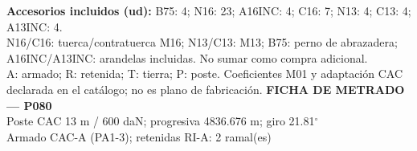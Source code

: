 \begingroup\scriptsize
\textbf{Accesorios incluidos (ud):} B75: 4; N16: 23; A16INC: 4; C16: 7; N13: 4; C13: 4; A13INC: 4.\\
N16/C16: tuerca/contratuerca M16; N13/C13: M13; B75: perno de abrazadera; A16INC/A13INC: arandelas incluidas. No sumar como compra adicional.\\
A: armado; R: retenida; T: tierra; P: poste. Coeficientes M01 y adaptación CAC declarada en el catálogo; no es plano de fabricación.
\endgroup\endgroup
\clearpage{}
\begingroup\small\setlength{\parskip}{3pt}\renewcommand{\arraystretch}{1.05}
\textbf{\large FICHA DE METRADO — P080}\\[4pt]
Poste CAC 13 m / 600 daN; progresiva 4836.676 m; giro 21.81\ensuremath{^\circ}\\
Armado CAC-A (PA1-3); retenidas RI-A: 2 ramal(es)\\
\begingroup\scriptsize
